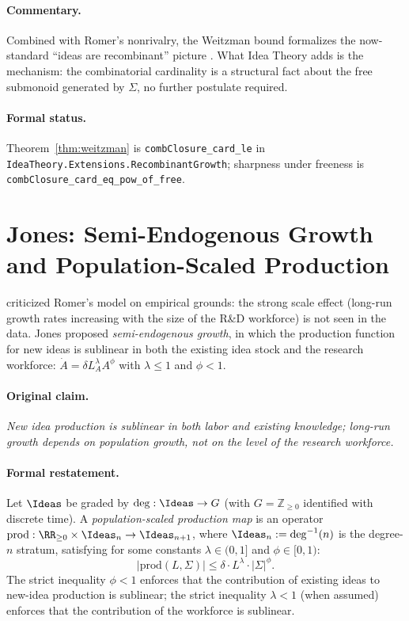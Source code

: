 \paragraph{Commentary.} Combined with Romer's nonrivalry, the Weitzman
bound formalizes the now-standard ``ideas are recombinant'' picture
\citep{Weitzman1998,Romer1990}. What Idea Theory adds is the
mechanism: the combinatorial cardinality is a structural fact about the
free submonoid generated by $\Sigma$, no further postulate required.

\paragraph{Formal status.} Theorem~\ref{thm:weitzman} is
\texttt{combClosure\_card\_le} in
\texttt{IdeaTheory.Extensions.RecombinantGrowth}; sharpness under
freeness is \texttt{combClosure\_card\_eq\_pow\_of\_free}.

\section{Jones: Semi-Endogenous Growth and Population-Scaled Production}
\label{sec:jones}

\citet{Jones1995} criticized Romer's model on empirical grounds: the
strong scale effect (long-run growth rates increasing with the size of
the R\&D workforce) is not seen in the data. Jones proposed
\emph{semi-endogenous growth}, in which the production function for new
ideas is sublinear in both the existing idea stock and the research
workforce: $\dot A = \delta L_A^\lambda A^\phi$ with $\lambda \leq 1$
and $\phi < 1$.

\paragraph{Original claim.} \emph{New idea production is sublinear in
both labor and existing knowledge; long-run growth depends on
population growth, not on the level of the research workforce.}

\paragraph{Formal restatement.} Let $\Ideas$ be graded by $\deg:\Ideas
\to G$ (with $G = \mathbb{Z}_{\geq 0}$ identified with discrete time).
A \emph{population-scaled production map} is an operator
$\mathrm{prod}: \RR_{\geq 0} \times \Ideas_n \to \Ideas_{n+1}$, where
$\Ideas_n := \deg^{-1}(n)$ is the degree-$n$ stratum, satisfying for
some constants $\lambda\in(0,1]$ and $\phi\in[0,1)$:
\[
  |\mathrm{prod}(L,\Sigma)| \leq \delta\cdot L^\lambda \cdot |\Sigma|^\phi.
\]
The strict inequality $\phi < 1$ enforces that the contribution of
existing ideas to new-idea production is sublinear; the strict
inequality $\lambda < 1$ (when assumed) enforces that the contribution
of the workforce is sublinear.

